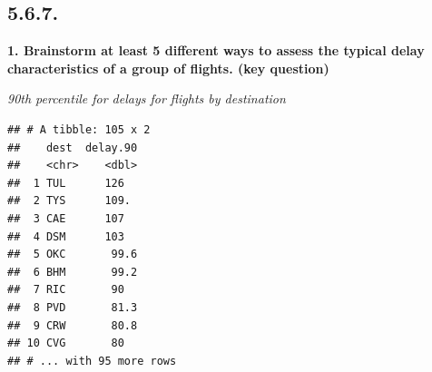 \documentclass[]{book}
\newenvironment{Shaded}{\begin{snugshade}}{\end{snugshade}}
\newcommand{\CommentTok}[1]{\textcolor[rgb]{0.56,0.35,0.01}{\textit{#1}}}
\newcommand{\DataTypeTok}[1]{\textcolor[rgb]{0.13,0.29,0.53}{#1}}
\newcommand{\DecValTok}[1]{\textcolor[rgb]{0.00,0.00,0.81}{#1}}
\newcommand{\FloatTok}[1]{\textcolor[rgb]{0.00,0.00,0.81}{#1}}
\newcommand{\KeywordTok}[1]{\textcolor[rgb]{0.13,0.29,0.53}{\textbf{#1}}}
\newcommand{\NormalTok}[1]{#1}
\newcommand{\OperatorTok}[1]{\textcolor[rgb]{0.81,0.36,0.00}{\textbf{#1}}}
\newcommand{\OtherTok}[1]{\textcolor[rgb]{0.56,0.35,0.01}{#1}}
\newcommand{\StringTok}[1]{\textcolor[rgb]{0.31,0.60,0.02}{#1}}
\theoremstyle{definition}
\theoremstyle{definition}
\theoremstyle{definition}
\theoremstyle{remark}
\begin{document}
\begin{Shaded}
\end{Shaded}

\hypertarget{section-9}{%
\subsection{5.6.7.}\label{section-9}}

\textbf{1. Brainstorm at least 5 different ways to assess the typical
delay characteristics of a group of flights. (key question)}

\emph{90th percentile for delays for flights by destination}

\begin{Shaded}
\end{Shaded}

\begin{verbatim}
## # A tibble: 105 x 2
##    dest  delay.90
##    <chr>    <dbl>
##  1 TUL      126  
##  2 TYS      109. 
##  3 CAE      107  
##  4 DSM      103  
##  5 OKC       99.6
##  6 BHM       99.2
##  7 RIC       90  
##  8 PVD       81.3
##  9 CRW       80.8
## 10 CVG       80  
## # ... with 95 more rows
\end{verbatim}
\end{document}
